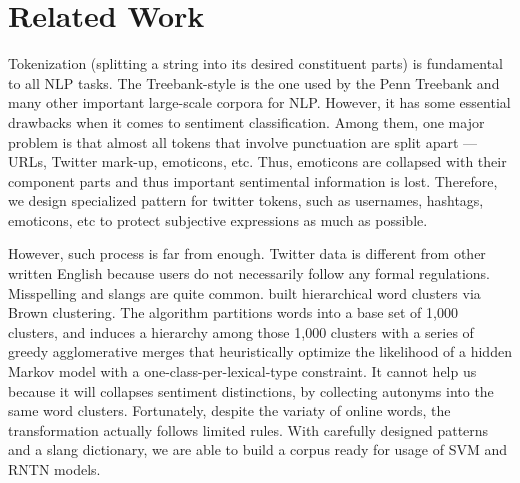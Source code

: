 \section{Related Work}
\label{sec:related}

Tokenization (splitting a string into its desired constituent parts) is fundamental to all NLP tasks. The Treebank-style is the one used by the Penn Treebank and many other important large-scale corpora for NLP. However, it has some essential drawbacks when it comes to sentiment classification. Among them, one major problem is that almost all tokens that involve punctuation are split apart — URLs, Twitter mark-up, emoticons, etc. Thus, emoticons are collapsed with their component parts and thus important sentimental information is lost. Therefore, we design specialized pattern for twitter tokens, such as usernames, hashtags, emoticons, etc to protect subjective expressions as much as possible. 

However, such process is far from enough. Twitter data is different from other written English because users do not necessarily follow any formal regulations. Misspelling and slangs are quite common. \cite{Owoputi:2013} built hierarchical word clusters via Brown clustering. The algorithm partitions words into a base set of 1,000 clusters, and induces a hierarchy among those 1,000 clusters with a series of greedy agglomerative merges that heuristically optimize the likelihood of a hidden Markov model with a one-class-per-lexical-type constraint. It cannot help us because it will collapses sentiment distinctions, by collecting autonyms into the same word clusters. Fortunately, despite the variaty of online words, the transformation actually follows limited rules. With carefully designed patterns and a slang dictionary, we are able to build a corpus ready for usage of SVM and RNTN models. 


